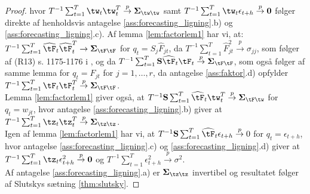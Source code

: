 \begin{proof}
hvor 
\(T^{-1} \sum_{t=1}^T \tw_t \tw_t^T \overset{p}{\rightarrow} \boldsymbol{\Sigma}_{\tw \tw}\) samt \(T^{-1} \sum_{t=1}^T \tw_t \epsilon_{t+h} \overset{p}{\rightarrow} \mathbf{0}\) følger direkte af henholdsvis antagelse \ref{ass:forecasting_ligning}.b) og \ref{ass:forecasting_ligning}.c).
Af lemma \ref{lem:factorlem1} har vi, at: \\
\(T^{-1} \sum_{t=1}^T \widehat{\tF}_t \widehat{\tF}_t^T \rightarrow \boldsymbol{\Sigma}_{\tF \tF}\) for \(q_t = S_j \widehat{F}_{jt}\), da \(T^{-1} \sum_{t=1}^T \widehat{F}_{jt}^2 \overset{p}{\rightarrow} \sigma_{jj}\), som følger af (R13) s. 1175-1176 i \citep{stock_watson_2002a}, og da \(T^{-1} \sum_{t=1}^T \mathbf{S} \widehat{\tF}_t \tF_t \overset{p}{\rightarrow} \boldsymbol{\Sigma}_{\tF \tF}\), som også følger af samme lemma for \(q_t =F_{jt}\) for \(j=1,\ldots, r\), da antagelse \ref{ass:faktor}.d) opfylder \(T^{-1} \sum_{t=1}^T \tF_t \tF_t^T \overset{p}{\rightarrow} \boldsymbol{\Sigma}_{\tF\tF}\). \\ 
Lemma \ref{lem:factorlem1} giver også, at 
\(T^{-1} \mathbf{S} \sum_{t=1}^T \widehat{\tF}_t \tw_t^T \overset{p}{\rightarrow} \boldsymbol{\Sigma}_{\tF \tw}\) for \(q_t = w_{jt}\), hvor antagelse \ref{ass:forecasting_ligning}.b) giver at \(T^{-1} \sum_{t=1}^T \tz_t \tz_t^T \overset{p}{\rightarrow} \boldsymbol{\Sigma}_{\tz \tz}\). \\
Igen af lemma \ref{lem:factorlem1} har vi, at \(T^{-1} \mathbf{S} \sum_{t=1}^T \widehat{\tF}_t \epsilon_{t+h} \overset{p}{\rightarrow} 0\) for \(q_t = \epsilon_{t+h}\), hvor antagelse \ref{ass:forecasting_ligning}.c) og \ref{ass:forecasting_ligning}.d) giver at \(T^{-1} \sum_{t=1}^T \tz_t \epsilon_{t+h}^2 \overset{p}{\rightarrow} \mathbf{0}\) og \(T^{-1} \sum_{t=1}^T \epsilon_{t+h}^2 \overset{p}{\rightarrow} \sigma^2\). \\
Af antagelse \ref{ass:forecasting_ligning}.a) er \(\boldsymbol{\Sigma}_{\tz \tz}\) invertibel og resultatet følger af Slutskys sætning \ref{thm:slutsky}.


\end{proof}
